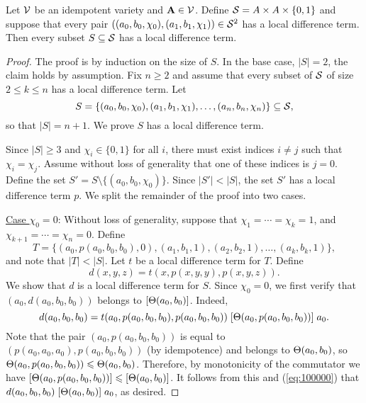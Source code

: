 \begin{thm} %
  \label{thm:local-diff-terms}
  Let $\mathcal{V}$ be an idempotent variety and
  $\mathbf{A} \in \mathcal{V}$. Define
  $\mathcal{S}= A \times A \times \{0,1\}$
  and suppose that every pair
  $((a_0, b_0, \chi_0), (a_1, b_1, \chi_1)) \in \mathcal{S}^2$
  has a local difference term.
  Then every subset $S \subseteq \mathcal{S}$
  has a local difference term.
\end{thm}
\begin{proof}
The proof is by induction on the size of $S$.  In the base case, $|S| = 2$,
the claim holds by assumption.
Fix $n\geq 2$ and assume that every subset of $\mathcal{S}$ of size $2\leq k \leq n$ has a local
difference term. Let
\[
S = \{(a_0, b_0, \chi_0), (a_1, b_1, \chi_1), \dots, (a_{n}, b_{n},\chi_{n})\} \subseteq \mathcal{S},\]
so that $|S| = n+1$.  We prove $S$ has a local difference term.

Since $|S| \geq 3$ and $\chi_i \in \{0,1\}$ for all $i$, there must exist
indices $i\neq j$ such that $\chi_i = \chi_j$. Assume without loss of generality
that one of these indices is $j=0$.  Define
the set
$S' = S \setminus \{(a_0, b_0, \chi_0)\}$.
Since $|S'| < |S|$, the set $S'$ has a local difference term $p$.
We split the remainder of the proof into two cases.

\medskip

\noindent \underline{Case $\chi_0 = 0$}:
Without loss of generality, suppose that $\chi_1 = %
\cdots =\chi_k = 1$,
and $\chi_{k+1} %
= \cdots = \chi_{n} = 0$. Define %
\[T = \{(a_0, p(a_0, b_0, b_0), 0),
(a_1, b_1, 1), (a_2, b_2, 1), 
\dots, (a_k, b_k, 1)\},\] and 
note that $|T| < |S|$.
Let $t$ be a local difference term for $T$.
Define
\[
d(x,y,z) = t(x, p(x,y,y), p(x,y,z)).
\]
We show that $d$ is a local difference term for $S$.
Since $\chi_0 =0$, we first verify that
$(a_0, d(a_0,b_0,b_0))$ belongs to $[\Theta(a_0,b_0)]$.
Indeed,
\begin{equation}
    \label{eq:100000}
  d(a_0,b_0,b_0) =
  t(a_0, p(a_0,b_0,b_0), p(a_0,b_0,b_0))\mathrel{[\Theta(a_0, p(a_0,b_0,b_0))]} a_0.
\end{equation}
Note that the pair $(a_0, p(a_0,b_0,b_0))$ is equal to
$(p(a_0,a_0,a_0), p(a_0,b_0,b_0))$ (by idempotence) and 
belongs to $\Theta(a_0, b_0)$, so $\Theta(a_0, p(a_0,b_0,b_0))\leqslant \Theta(a_0,b_0)$.
Therefore,
by monotonicity of the commutator we have
$[\Theta(a_0, p(a_0,b_0,b_0))] \leqslant [\Theta(a_0,b_0)]$.
It follows from this and (\ref{eq:100000}) that
$d(a_0,b_0,b_0)\mathrel{[\Theta(a_0,b_0)]} a_0$, as desired.


\end{proof}
